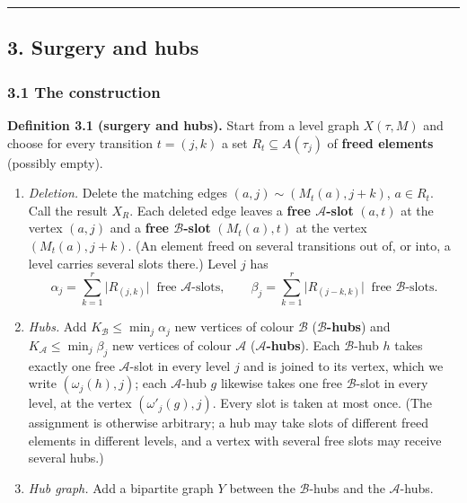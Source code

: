 \documentclass[
  11pt,
]{article}
\providecommand{\tightlist}{%
  \setlength{\itemsep}{0pt}\setlength{\parskip}{0pt}}
\begin{document}
\begin{center}\rule{0.5\linewidth}{0.5pt}\end{center}

\hypertarget{surgery-and-hubs}{%
\subsection{3. Surgery and hubs}\label{surgery-and-hubs}}

\hypertarget{the-construction}{%
\subsubsection{3.1 The construction}\label{the-construction}}

\textbf{Definition 3.1 (surgery and hubs).} Start from a level graph \(X(\tau, M)\) and choose for every transition
\(t=(j,k)\) a set \(R_t\subseteq A(\tau_j)\) of \textbf{freed elements} (possibly empty).

\begin{enumerate}
\def\labelenumi{\arabic{enumi}.}
\tightlist
\item
  \emph{Deletion.} Delete the matching edges \((a,j)\sim(M_t(a),j+k)\), \(a\in R_t\). Call the result \(X_R\). Each
  deleted edge leaves a \textbf{free \(\mathcal A\)-slot} \((a,t)\) at the vertex \((a,j)\) and a \textbf{free
  \(\mathcal B\)-slot} \((M_t(a),t)\) at the vertex \((M_t(a), j+k)\). (An element freed on several transitions out of,
  or into, a level carries several slots there.) Level \(j\) has
  \[\alpha_j = \sum_{k=1}^r \lvert R_{(j,k)}\rvert\ \text{ free }\mathcal A\text{-slots},\qquad
    \beta_j = \sum_{k=1}^r \lvert R_{(j-k,k)}\rvert\ \text{ free }\mathcal B\text{-slots}.\]
\item
  \emph{Hubs.} Add \(K_{\mathcal B}\le\min_j\alpha_j\) new vertices of colour \(\mathcal B\)
  (\textbf{\(\mathcal B\)-hubs}) and \(K_{\mathcal A}\le\min_j\beta_j\) new vertices of colour \(\mathcal A\)
  (\textbf{\(\mathcal A\)-hubs}). Each \(\mathcal B\)-hub \(h\) takes exactly one free \(\mathcal A\)-slot in every
  level \(j\) and is joined to its vertex, which we write \((\omega_j(h), j)\); each \(\mathcal A\)-hub \(g\) likewise
  takes one free \(\mathcal B\)-slot in every level, at the vertex \((\omega'_j(g), j)\). Every slot is taken at most
  once. (The assignment is otherwise arbitrary; a hub may take slots of different freed elements in different levels,
  and a vertex with several free slots may receive several hubs.)
\item
  \emph{Hub graph.} Add a bipartite graph \(Y\) between the \(\mathcal B\)-hubs and the \(\mathcal A\)-hubs.
\end{enumerate}
\end{document}
